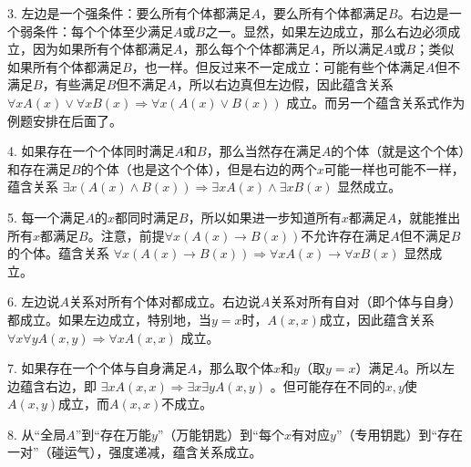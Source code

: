 \documentclass[lang=cn,11pt]{elegantbook}
\begin{document}
3. 左边是一个强条件：要么所有个体都满足$A$，要么所有个体都满足$B$。右边是一个弱条件：每个个体至少满足$A$或$B$之一。显然，如果左边成立，那么右边必须成立，因为如果所有个体都满足$A$，那么每个个体都满足$A$，所以满足$A$或$B$；类似如果所有个体都满足$B$，也一样。但反过来不一定成立：可能有些个体满足$A$但不满足$B$，有些满足$B$但不满足$A$，所以右边真但左边假，因此蕴含关系 $\forall xA(x)\lor \forall xB(x)\Rightarrow \forall x(A(x)\lor B(x))$ 成立。而另一个蕴含关系式作为例题安排在后面了。

4. 如果存在一个个体同时满足$A$和$B$，那么当然存在满足$A$的个体（就是这个个体）和存在满足$B$的个体（也是这个个体），但是右边的两个$x$可能一样也可能不一样，蕴含关系 $\exists x(A(x)\land B(x))\Rightarrow \exists xA(x)\land \exists xB(x)$ 显然成立。

5. 每一个满足$A$的$x$都同时满足$B$，所以如果进一步知道所有$x$都满足$A$，就能推出所有$x$都满足$B$。注意，前提$\forall x(A(x)\to B(x))$不允许存在满足$A$但不满足$B$的个体。蕴含关系 $\forall x(A(x)\to B(x))\Rightarrow \forall xA(x)\to \forall xB(x)$ 显然成立。

6. 左边说$A$关系对所有个体对都成立。右边说$A$关系对所有自对（即个体与自身）都成立。如果左边成立，特别地，当$y=x$时，$A(x,x)$成立，因此蕴含关系 $\forall x\forall yA(x,y)\Rightarrow \forall xA(x,x)$ 成立。

7. 如果存在一个个体与自身满足$A$，那么取个体$x$和$y$（取$y=x$）满足$A$。所以左边蕴含右边，即 $\exists xA(x,x)\Rightarrow \exists x\exists yA(x,y)$ 。但可能存在不同的$x,y$使$A(x,y)$成立，而$A(x,x)$不成立。

8. 从“全局$A$”到“存在万能$y$”（万能钥匙）到“每个$x$有对应$y$”（专用钥匙）到“存在一对”（碰运气），强度递减，蕴含关系成立。
\end{document}
